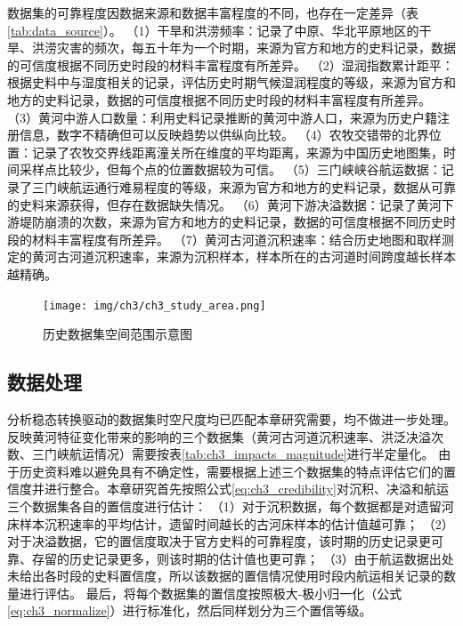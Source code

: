 数据集的可靠程度因数据来源和数据丰富程度的不同，也存在一定差异（表\ref{tab:data_source}）。
（1）干旱和洪涝频率：记录了中原、华北平原地区的干旱、洪涝灾害的频次，每五十年为一个时期，来源为官方和地方的史料记录，数据的可信度根据不同历史时段的材料丰富程度有所差异。
（2）湿润指数累计距平：根据史料中与湿度相关的记录，评估历史时期气候湿润程度的等级，来源为官方和地方的史料记录，数据的可信度根据不同历史时段的材料丰富程度有所差异。
（3）黄河中游人口数量：利用史料记录推断的黄河中游人口，来源为历史户籍注册信息，数字不精确但可以反映趋势以供纵向比较。
（4）农牧交错带的北界位置：记录了农牧交界线距离潼关所在维度的平均距离，来源为中国历史地图集，时间采样点比较少，但每个点的位置数据较为可信。
（5）三门峡峡谷航运数据：记录了三门峡航运通行难易程度的等级，来源为官方和地方的史料记录，数据从可靠的史料来源获得，但存在数据缺失情况。
（6）黄河下游决溢数据：记录了黄河下游堤防崩溃的次数，来源为官方和地方的史料记录，数据的可信度根据不同历史时段的材料丰富程度有所差异。
（7）黄河古河道沉积速率：结合历史地图和取样测定的黄河古河道沉积速率，来源为沉积样本，样本所在的古河道时间跨度越长样本越精确。

\begin{figure}[!h] %
    \texttt{[image: img/ch3/ch3\_study\_area.png]}
    \caption{历史数据集空间范围示意图}\label{ch3:fig:study_area}
\end{figure}



\subsection{数据处理}

分析稳态转换驱动的数据集时空尺度均已匹配本章研究需要，均不做进一步处理。
反映黄河特征变化带来的影响的三个数据集（黄河古河道沉积速率、洪泛决溢次数、三门峡航运情况）需要按表\ref{tab:ch3_impacts_magnitude}进行半定量化。
由于历史资料难以避免具有不确定性，需要根据上述三个数据集的特点评估它们的置信度并进行整合。本章研究首先按照公式\ref{eq:ch3_credibility}对沉积、决溢和航运三个数据集各自的置信度进行估计：
（1）对于沉积数据，每个数据都是对遗留河床样本沉积速率的平均估计，遗留时间越长的古河床样本的估计值越可靠；
（2）对于决溢数据，它的置信度取决于官方史料的可靠程度，该时期的历史记录更可靠、存留的历史记录更多，则该时期的估计值也更可靠；
（3）由于航运数据出处未给出各时段的史料置信度，所以该数据的置信情况使用时段内航运相关记录的数量进行评估。
最后，将每个数据集的置信度按照极大-极小归一化（公式\ref{eq:ch3_normalize}）进行标准化，然后同样划分为三个置信等级。

